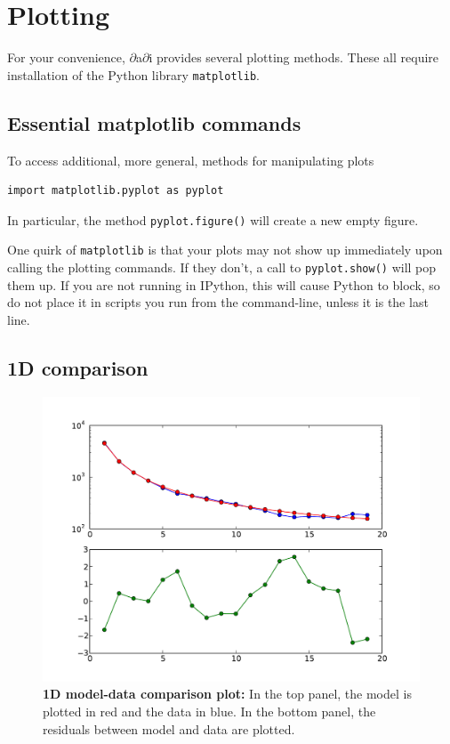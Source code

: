 \documentclass[12pt]{article}
\makeatletter
\newcommand{\dadi}{$\partial$a$\partial$i\xspace}
\newcommand{\py}[1]{\lstinline[language=Python, showstringspaces=False]@#1@}
\makeatother
\begin{document}
\section{Plotting}

For your convenience, \dadi provides several plotting methods.
These all require installation of the Python library \py{matplotlib}.

\subsection{Essential matplotlib commands}
To access additional, more general, methods for manipulating plots
\begin{lstlisting}
import matplotlib.pyplot as pyplot
\end{lstlisting}
In particular, the method \py{pyplot.figure()} will create a new empty figure.

One quirk of \py{matplotlib} is that your plots may not show up immediately upon calling the plotting commands.
If they don't, a call to \py{pyplot.show()} will pop them up.
If you are not running in IPython, this will cause Python to block, so do not place it in scripts you run from the command-line, unless it is the last line.

\subsection{1D comparison}

\begin{figure}
\centering
\includegraphics[scale=0.5]{1d_comp}
\caption{\textbf{1D model-data comparison plot:} In the top panel, the model is plotted in red and the data in blue. In the bottom panel, the residuals between model and data are plotted.\label{fig:1d_comp}}
\end{figure}
\end{document}
